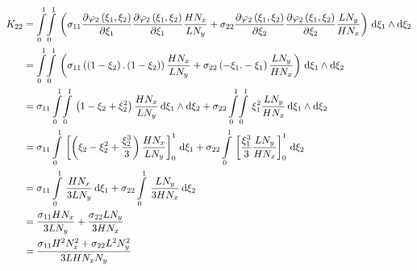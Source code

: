 \begin{equation}
  \begin{aligned}
    K_{22}&=\giint{0}{1}{0}{1}{\pbrac{\sigma_{11}\delby{\lbfn{2}{\xi_{1},\xi_{2}}}{\xi_{1}}\delby{\lbfn{2}{\xi_{1},\xi_{2}}}{\xi_{1}}
        \dfrac{H N_{x}}{L N_{y}}+\sigma_{22}\delby{\lbfn{2}{\xi_{1},\xi_{2}}}{\xi_{2}}\delby{\lbfn{2}{\xi_{1},\xi_{2}}}{\xi_{2}}
        \dfrac{L N_{y}}{H N_{x}}}}{\xi_{1}}{\xi_{2}}\\
    &=\giint{0}{1}{0}{1}{\pbrac{\sigma_{11}\pbrac{\pbrac{1-\xi_{2}}.\pbrac{1-\xi_{2}}}\dfrac{H N_{x}}{L N_{y}}+
    \sigma_{22}\pbrac{-\xi_{1}.-\xi_{1}}\dfrac{L N_{y}}{H N_{x}}}}{\xi_{1}}{\xi_{2}} \\
    &=\sigma_{11}\giint{0}{1}{0}{1}{\pbrac{1-\xi_{2}+\xi_{2}^{2}}\dfrac{H N_{x}}{L N_{y}}}{\xi_{1}}{\xi_{2}}+
    \sigma_{22}\giint{0}{1}{0}{1}{\xi_{1}^{2}\dfrac{L N_{y}}{H N_{x}}}{\xi_{1}}{\xi_{2}} \\
    &=\sigma_{11}\gint{0}{1}{\sqbrac{\pbrac{\xi_{2}-\xi_{2}^{2}+\dfrac{\xi_{2}^{3}}{3}}\dfrac{H N_{x}}{L N_{y}}}_{0}^{1}}{\xi_{1}}+
    \sigma_{22}\gint{0}{1}{\sqbrac{\dfrac{\xi_{1}^{3}}{3}\dfrac{L N_{y}}{H N_{x}}}_{0}^{1}}{\xi_{2}} \\
    &=\sigma_{11}\gint{0}{1}{\dfrac{H N_{x}}{3 L N_{y}}}{\xi_{1}}+\sigma_{22}\gint{0}{1}{\dfrac{L N_{y}}{3 H N_{x}}}{\xi_{2}} \\
    &=\dfrac{\sigma_{11}H N_{x}}{3 L N_{y}}+\dfrac{\sigma_{22}L N_{y}}{3 H N_{x}} \\
    &=\dfrac{\sigma_{11}H^{2}N_{x}^{2}+\sigma_{22}L^{2}N_{y}^{2}}{3 L H N_{x} N_{y}}
  \end{aligned}
\end{equation}

